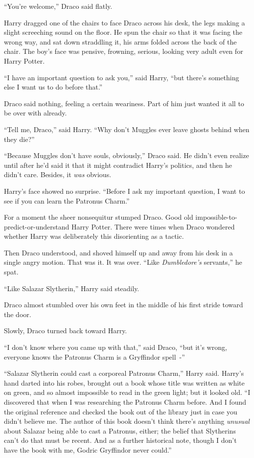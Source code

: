 ``You're welcome,'' Draco said flatly.

Harry dragged one of the chairs to face Draco across his desk, the legs making a slight screeching sound on the floor. He spun the chair so that it was facing the wrong way, and sat down straddling it, his arms folded across the back of the chair. The boy's face was pensive, frowning, serious, looking very adult even for Harry Potter.

``I have an important question to ask you,'' said Harry, ``but there's something else I want us to do before that.''

Draco said nothing, feeling a certain weariness. Part of him just wanted it all to be over with already.

``Tell me, Draco,'' said Harry. ``Why don't Muggles ever leave ghosts behind when they die?''

``Because Muggles don't have souls, obviously,'' Draco said. He didn't even realize until after he'd said it that it might contradict Harry's politics, and then he didn't care. Besides, it \emph{was} obvious.

Harry's face showed no surprise. ``Before I ask my important question, I want to see if you can learn the Patronus Charm.''

For a moment the sheer nonsequitur stumped Draco. Good old impossible-to-predict-or-understand Harry Potter. There were times when Draco wondered whether Harry was deliberately this disorienting as a tactic.

Then Draco understood, and shoved himself up and away from his desk in a single angry motion. That was it. It was over. ``Like \emph{Dumbledore's} servants,'' he spat.

``Like Salazar Slytherin,'' Harry said steadily.

Draco almost stumbled over his own feet in the middle of his first stride toward the door.

Slowly, Draco turned back toward Harry.

``I don't know where you came up with that,'' said Draco, ``but it's wrong, everyone knows the Patronus Charm is a Gryffindor spell~-''

``Salazar Slytherin could cast a corporeal Patronus Charm,'' Harry said. Harry's hand darted into his robes, brought out a book whose title was written as white on green, and so almost impossible to read in the green light; but it looked old. ``I discovered that when I was researching the Patronus Charm before. And I found the original reference and checked the book out of the library just in case you didn't believe me. The author of this book doesn't think there's anything \emph{unusual} about Salazar being able to cast a Patronus, either; the belief that Slytherins can't do that must be recent. And as a further historical note, though I don't have the book with me, Godric Gryffindor never could.''

